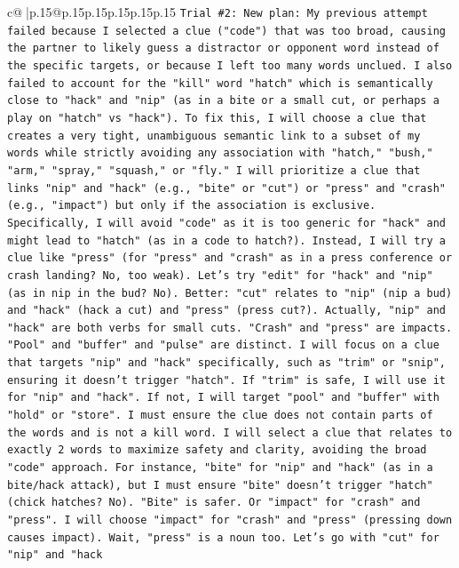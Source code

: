 \documentclass{article}
\begin{document}
{\begin{supertabular}{c@{$\;$}|p{.15\linewidth}@{}p{.15\linewidth}p{.15\linewidth}p{.15\linewidth}p{.15\linewidth}p{.15\linewidth}}
{{{\texttt{Trial \#2: New plan: My previous attempt failed because I selected a clue ("code") that was too broad, causing the partner to likely guess a distractor or opponent word instead of the specific targets, or because I left too many words unclued. I also failed to account for the "kill" word "hatch" which is semantically close to "hack" and "nip" (as in a bite or a small cut, or perhaps a play on "hatch" vs "hack"). To fix this, I will choose a clue that creates a very tight, unambiguous semantic link to a subset of my words while strictly avoiding any association with "hatch," "bush," "arm," "spray," "squash," or "fly." I will prioritize a clue that links "nip" and "hack" (e.g., "bite" or "cut") or "press" and "crash" (e.g., "impact") but only if the association is exclusive. Specifically, I will avoid "code" as it is too generic for "hack" and might lead to "hatch" (as in a code to hatch?). Instead, I will try a clue like "press" (for "press" and "crash" as in a press conference or crash landing? No, too weak). Let's try "edit" for "hack" and "nip" (as in nip in the bud? No). Better: "cut" relates to "nip" (nip a bud) and "hack" (hack a cut) and "press" (press cut?). Actually, "nip" and "hack" are both verbs for small cuts. "Crash" and "press" are impacts. "Pool" and "buffer" and "pulse" are distinct. I will focus on a clue that targets "nip" and "hack" specifically, such as "trim" or "snip", ensuring it doesn't trigger "hatch". If "trim" is safe, I will use it for "nip" and "hack". If not, I will target "pool" and "buffer" with "hold" or "store". I must ensure the clue does not contain parts of the words and is not a kill word. I will select a clue that relates to exactly 2 words to maximize safety and clarity, avoiding the broad "code" approach. For instance, "bite" for "nip" and "hack" (as in a bite/hack attack), but I must ensure "bite" doesn't trigger "hatch" (chick hatches? No). "Bite" is safer. Or "impact" for "crash" and "press". I will choose "impact" for "crash" and "press" (pressing down causes impact). Wait, "press" is a noun too. Let's go with "cut" for "nip" and "hack} \\
\\ 
}}}
\end{supertabular}}
\end{document}
